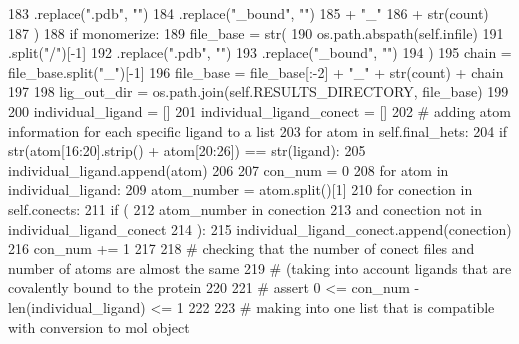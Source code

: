 \begin{DoxyCode}
183                                 .replace(\textcolor{stringliteral}{".pdb"}, \textcolor{stringliteral}{""})
184                                 .replace(\textcolor{stringliteral}{"\_bound"}, \textcolor{stringliteral}{""})
185                                 + \textcolor{stringliteral}{"\_"}
186                                 + str(count)
187                             )
188             \textcolor{keywordflow}{if} monomerize:
189                 file\_base = str(
190                                 os.path.abspath(self.infile)
191                                 .split(\textcolor{stringliteral}{"/"})[-1]
192                                 .replace(\textcolor{stringliteral}{".pdb"}, \textcolor{stringliteral}{""})
193                                 .replace(\textcolor{stringliteral}{"\_bound"}, \textcolor{stringliteral}{""})
194                             )
195                 chain = file\_base.split(\textcolor{stringliteral}{"\_"})[-1]
196                 file\_base = file\_base[:-2] + \textcolor{stringliteral}{"\_"} + str(count) + chain
197 
198         lig\_out\_dir = os.path.join(self.RESULTS\_DIRECTORY, file\_base)
199 
200         individual\_ligand = []
201         individual\_ligand\_conect = []
202         \textcolor{comment}{# adding atom information for each specific ligand to a list}
203         \textcolor{keywordflow}{for} atom \textcolor{keywordflow}{in} self.final\_hets:
204             \textcolor{keywordflow}{if} str(atom[16:20].strip() + atom[20:26]) == str(ligand):
205                 individual\_ligand.append(atom)
206 
207         con\_num = 0
208         \textcolor{keywordflow}{for} atom \textcolor{keywordflow}{in} individual\_ligand:
209             atom\_number = atom.split()[1]
210             \textcolor{keywordflow}{for} conection \textcolor{keywordflow}{in} self.conects:
211                 \textcolor{keywordflow}{if} (
212                     atom\_number \textcolor{keywordflow}{in} conection
213                     \textcolor{keywordflow}{and} conection \textcolor{keywordflow}{not} \textcolor{keywordflow}{in} individual\_ligand\_conect
214                 ):
215                     individual\_ligand\_conect.append(conection)
216                     con\_num += 1
217 
218         \textcolor{comment}{# checking that the number of conect files and number of atoms are almost the same}
219         \textcolor{comment}{# (taking into account ligands that are covalently bound to the protein}
220 
221         \textcolor{comment}{# assert 0 <= con\_num - len(individual\_ligand) <= 1}
222 
223         \textcolor{comment}{# making into one list that is compatible with conversion to mol object}

\end{DoxyCode}
